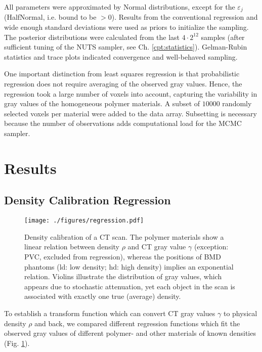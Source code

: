 All parameters were approximated by Normal distributions, except for the \(\varepsilon_{j}\) (HalfNormal, i.e. bound to be \(>0\)).
Results from the conventional regression and wide enough standard deviations were used as priors to initialize the sampling.
The posterior distributions were calculated from the last \(4\cdot 2^{12}\) samples (after sufficient tuning of the NUTS sampler, see Ch. \ref{cpt:statistics}).
Gelman-Rubin statistics and trace plots indicated convergence and well-behaved sampling.


One important distinction from least squares regression is that probabilistic regression does not require averaging of the observed gray values.
Hence, the regression took a large number of voxels into account, capturing the variability in gray values of the homogeneous polymer materials.
A subset of \(10000\) randomly selected voxels per material were added to the data array.
Subsetting is necessary because the number of observations adds computational load for the MCMC sampler.


\clearpage
\section{Results}
\label{sec:orgaf2577a}
\subsection{Density Calibration Regression}
\label{sec:orge7a5149}
\begin{figure}[p]
\centering
\texttt{[image: ./figures/regression.pdf]}
\caption{\label{fig:density_calibration}Density calibration of a CT scan. The polymer materials show a linear relation between density \(\rho\) and CT gray value \(\gamma\) (exception: PVC, excluded from regression), whereas the positions of BMD phantoms (ld: low density; hd: high density) implies an exponential relation. Violins illustrate the distribution of gray values, which appears due to stochastic attenuation, yet each object in the scan is associated with exactly one true (average) density.}
\end{figure}

To establish a transform function which can convert CT gray values \(\gamma\) to physical density \(\rho\) and back, we compared different regression functions which fit the observed gray values of different polymer- and other materials of known densities (Fig. \ref{fig:density_calibration}).

